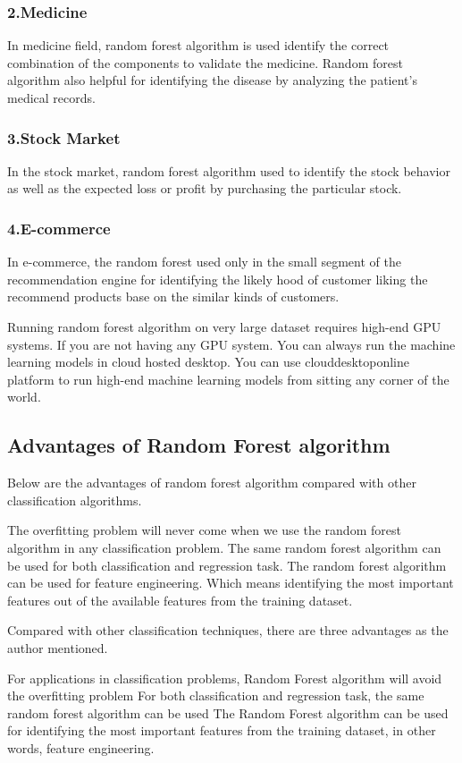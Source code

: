 \documentclass[a4paper,12pt]{article}
\begin{document}
\subsubsection*{2.Medicine}
In medicine field, random forest algorithm is used identify the correct combination of the components to validate the medicine. Random forest algorithm also helpful for identifying the disease by analyzing the patient’s medical records.

\subsubsection*{3.Stock Market}
In the stock market, random forest algorithm used to identify the stock behavior as well as the expected loss or profit by purchasing the particular stock.

\subsubsection*{4.E-commerce}
In e-commerce, the random forest used only in the small segment of the recommendation engine for identifying the likely hood of customer liking the recommend products base on the similar kinds of customers.

Running random forest algorithm on very large dataset requires high-end GPU systems. If you are not having any GPU system. You can always run the machine learning models in cloud hosted desktop. You can use clouddesktoponline platform to run high-end machine learning models from sitting any corner of the world.

\subsection*{Advantages of Random Forest algorithm}
Below are the advantages of random forest algorithm compared with other classification algorithms.

The overfitting problem will never come when we use the random forest algorithm in any classification problem.
The same random forest algorithm can be used for both classification and regression task.
The random forest algorithm can be used for feature engineering.
Which means identifying the most important features out of the available features from the training dataset.


Compared with other classification techniques, there are three advantages as the author mentioned.

For applications in classification problems, Random Forest algorithm will avoid the overfitting problem
For both classification and regression task, the same random forest algorithm can be used
The Random Forest algorithm can be used for identifying the most important features from the training dataset, in other words, feature engineering.
\end{document}

